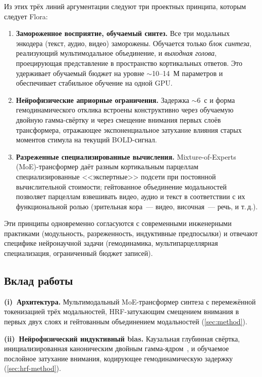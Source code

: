 \documentclass[11pt,a4paper]{article}
\begin{document}
Из этих трёх линий аргументации следуют три проектных принципа,
которым следует Flora:

\begin{enumerate}[label=(\arabic*), leftmargin=*, itemsep=1pt]
    \item \textbf{Замороженное восприятие, обучаемый синтез.}
          Все три модальных энкодера (текст, аудио, видео) заморожены.
          Обучается только \emph{блок синтеза}, реализующий мультимодальное
          объединение, и \emph{выходная голова}, проецирующая
          представление в пространство кортикальных ответов. Это
          удерживает обучаемый бюджет на уровне $\sim$10--14~М параметров
          и обеспечивает стабильное обучение на одной GPU.
    \item \textbf{Нейрофизические априорные ограничения.}
          Задержка $\sim$6~с и форма гемодинамического отклика
          встроены конструктивно через обучаемую двойную гамма-свёртку
          и через смещение внимания первых слоёв трансформера,
          отражающее экспоненциальное затухание влияния старых
          моментов стимула на текущий BOLD-сигнал.
    \item \textbf{Разреженные специализированные вычисления.}
          Mixture-of-Experts (MoE)-трансформер даёт разным кортикальным
          парцеллам специализированные <<экспертные>> подсети при
          постоянной вычислительной стоимости; гейтованное
          объединение модальностей позволяет парцеллам взвешивать
          видео, аудио и текст в соответствии с их функциональной
          ролью (зрительная кора~--- видео, височная~--- речь, и т.\,д.).
\end{enumerate}

Эти принципы одновременно согласуются с современными инженерными
практиками (модульность, разреженность, индуктивные предпосылки) и
отвечают специфике нейронаучной задачи (гемодинамика,
мультипарцеллярная специализация, ограниченный бюджет записей).

\subsection{Вклад работы}
\label{sec:intro-contrib}

\noindent\textbf{(i)~Архитектура.} Мультимодальный MoE-трансформер
синтеза с перемежённой токенизацией трёх модальностей,
HRF-затухающим смещением внимания в первых двух слоях и гейтованным
объединением модальностей (\cref{sec:method}).

\noindent\textbf{(ii)~Нейрофизический индуктивный bias.} Каузальная
глубинная свёртка, инициализированная каноническим двойным
гамма-ядром~\cite{Glover1999,Lindquist2019}, и обучаемое послойное
затухание внимания, кодирующее гемодинамическую задержку
(\cref{sec:hrf-method}).
\end{document}
